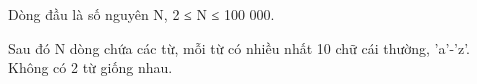 Dòng đầu là số nguyên N, 2 ≤ N ≤ 100 000.

Sau đó N dòng chứa các từ, mỗi từ có nhiều nhất 10 chữ cái thường, 'a'-'z'. Không có 2 từ giống nhau.

\